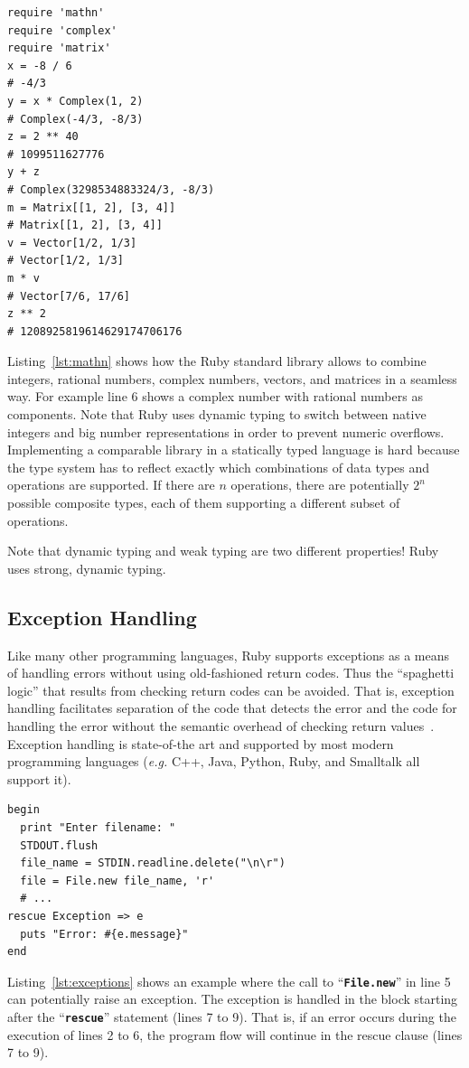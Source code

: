 \documentclass[12pt,a4paper,oneside,openright]{book}
\newcommand{\eg}{\emph{e.g.} }
\newcommand{\Eg}{For ex\-am\-ple }
\newcommand{\Ie}{That is, }
\newcommand{\lst}[1]{Listing~\ref{lst:#1}}
\newcommand{\code}[1]{``\texttt{\textbf{\textcolor{codegray}{\small{#1}}}}''}
\begin{document}
\begin{CJK}{UTF8}{}
\lstset{language=Ruby,frame=single,numbers=left}
\begin{lstlisting}[float,caption={Numerical types in Ruby},label=lst:mathn]
require 'mathn'
require 'complex'
require 'matrix'
x = -8 / 6                        
# -4/3
y = x * Complex(1, 2)             
# Complex(-4/3, -8/3)
z = 2 ** 40                       
# 1099511627776
y + z                             
# Complex(3298534883324/3, -8/3)
m = Matrix[[1, 2], [3, 4]]        
# Matrix[[1, 2], [3, 4]]
v = Vector[1/2, 1/3]              
# Vector[1/2, 1/3]
m * v                             
# Vector[7/6, 17/6]
z ** 2                            
# 1208925819614629174706176
\end{lstlisting}
\lst{mathn} shows how the Ruby standard library allows to combine integers, rational numbers, complex numbers, vectors, and matrices in a seamless way. \Eg line 6 shows a complex number with rational numbers as components. Note that Ruby uses dynamic typing to switch between native integers and big number representations in order to prevent numeric overflows. Implementing a comparable library in a statically typed language is hard because the type system has to reflect exactly which combinations of data types and operations are supported. If there are $n$ operations, there are potentially $2^n$ possible composite types, each of them supporting a different subset of operations.

Note that dynamic typing and weak typing are two different properties! Ruby uses strong, dynamic typing.

\subsection{Exception Handling}
Like many other programming languages, Ruby supports exceptions as a means of handling errors without using old-fashioned return codes. Thus the ``spaghetti logic'' that results from checking return codes can be avoided. \Ie exception handling facilitates separation of the code that detects the error and the code for handling the error without the semantic overhead of checking return values~\citep{RefWorks:541}. Exception handling is state-of-the art and supported by most modern programming languages (\eg C++, Java, Python, Ruby, and Smalltalk all support it).

\lstset{language=Ruby,frame=single,numbers=left}
\begin{lstlisting}[float=htbp,caption={Exception handling in Ruby},label=lst:exceptions]
begin
  print "Enter filename: "
  STDOUT.flush
  file_name = STDIN.readline.delete("\n\r")
  file = File.new file_name, 'r'
  # ...
rescue Exception => e
  puts "Error: #{e.message}"
end
\end{lstlisting}
\lst{exceptions} shows an example where the call to \code{File.new} in line 5 can potentially raise an exception. The exception is handled in the block starting after the \code{res\-cue} statement (lines 7 to 9). \Ie if an error occurs during the execution of lines 2 to 6, the program flow will continue in the rescue clause (lines 7 to 9).


\end{CJK}
\end{document}
